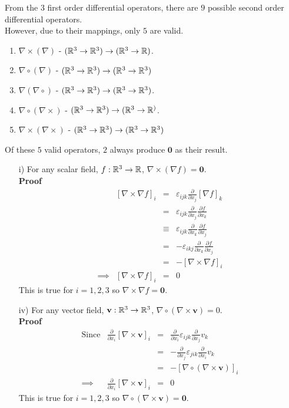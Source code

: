 \documentclass[11pt,a4paper]{article}
\begin{document}
From the $3$ first order differential operators, there are $9$ possible second order differential operators.\\
However, due to their mappings, only $5$ are valid.
\begin{enumerate}[label=\roman*)]
  \item $\nabla\times(\nabla)$ - $(\mathbb{R}^3\to\mathbb{R}^3) \to (\mathbb{R}^3\to\mathbb{R})$.
  \item $\nabla\circ(\nabla)$ - $(\mathbb{R}^3\to\mathbb{R}^3) \to (\mathbb{R}^3\to\mathbb{R}^3)$
  \item $\nabla(\nabla\circ)$ - $(\mathbb{R}^3\to\mathbb{R}^3) \to (\mathbb{R}^3\to\mathbb{R}^3)$.
  \item $\nabla\circ(\nabla\times)$ - $(\mathbb{R}^3\to\mathbb{R}^3) \to (\mathbb{R}^3\to\mathbb{R}^)$.
  \item $\nabla\times(\nabla\times)$ - $(\mathbb{R}^3\to\mathbb{R}^3) \to (\mathbb{R}^3\to\mathbb{R}^3)$
\end{enumerate}

Of these $5$ valid operators, $2$ always produce $\textbf{0}$ as their result.
\begin{itemize}
  \item[i)] For any scalar field, $f:\mathbb{R}^3\to\mathbb{R}$, $\nabla\times(\nabla f)=\textbf{0}$.\\
  \textbf{Proof}
  \[\begin{array}{rrcl}
    &[\nabla\times\nabla f]_i &=& \varepsilon_{ijk}\frac{\partial}{\partial x_j}[\nabla f]_k\\
    &&=&\varepsilon_{ijk}\frac{\partial}{\partial x_j}\frac{\partial f}{\partial x_k}\\
    &&\equiv&\varepsilon_{ijk}\frac{\partial}{\partial x_k}\frac{\partial f}{\partial x_j}\\
    &&=&-\varepsilon_{ikj}\frac{\partial}{\partial x_k}\frac{\partial f}{\partial x_j}\\
    &&=&-[\nabla\times\nabla f]_i\\
    \implies&[\nabla\times\nabla f]_i&=&0
  \end{array}\]
  This is true for $i=1,2,3$ so $\nabla\times\nabla f=\textbf{0}$.
  \item[iv)] For any vector field, $\textbf{v}:\mathbb{R}^3\to\mathbb{R}^3$, $\nabla\circ(\nabla\times\textbf{v})=0$.\\
  \textbf{Proof}
  \[\begin{array}{rrcl}
  \mathrm{Since}&\frac{\partial}{\partial x_i}[\nabla\times\textbf{v}]_i&=&\frac{\partial}{\partial x_i}\varepsilon_{ijk}\frac{\partial}{\partial x_j}v_k\\
  &&=&-\frac{\partial}{\partial x_j}\varepsilon_{jik}\frac{\partial}{\partial x_i}v_k\\
  &&=&-[\nabla\circ(\nabla\times\textbf{v})]_i\\
  \implies&\frac{\partial}{\partial x_i}[\nabla\times\textbf{v}]_i&=&0
  \end{array}\]
  This is true for $i=1,2,3$ so $\nabla\circ(\nabla\times\textbf{v})=\textbf{0}$.
\end{itemize}
\end{document}
